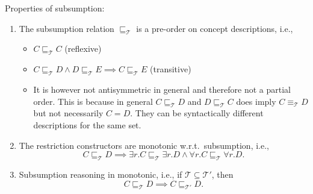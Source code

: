 \begin{lemma}
	Properties of subsumption:
	\begin{enumerate}
		\item The subsumption relation $\sqsubseteq_{\mathcal{T}}$ is a pre-order on concept descriptions, i.e.,
			\begin{itemize}
				\item $C \sqsubseteq_{\mathcal{T}}C$ (reflexive)
				\item $C \sqsubseteq_{\mathcal{T}} D \land D \sqsubseteq_{\mathcal{T}} E \implies C \sqsubseteq_{\mathcal{T}} E$ (transitive)
				\item It is however not antisymmetric in general and therefore not a partial order.
					This is because in general $C \sqsubseteq_{\mathcal{T}} D$ and $D \sqsubseteq_{\mathcal{T}} C$
					does imply $C \equiv_{\mathcal{T}} D$ but not necessarily $C = D$.
					They can be syntactically different descriptions for the same set.
			\end{itemize}
		\item The restriction constructors are monotonic w.r.t.\ subsumption, i.e.,
			\[
			C \sqsubseteq_{\mathcal{T}} D \implies \exists r.C \sqsubseteq_{\mathcal{T}} \exists r.D \land \forall r.C \sqsubseteq_{\mathcal{T}} \forall r.D
			.\] 
		\item Subsumption reasoning in monotonic, i.e., if $\mathcal{T} \subseteq  \mathcal{T}'$, then
			\[
				C \sqsubseteq_{\mathcal{T}} D \implies C \sqsubseteq_{\mathcal{T}'} D
			.\] 
	\end{enumerate}
\end{lemma}
